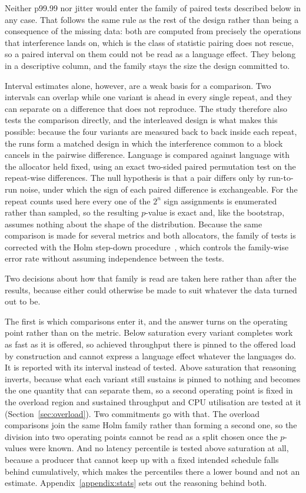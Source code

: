 \documentclass[english,oneside,a4paper,censored,csm,software-track-2020]{HYthesisML}
\begin{document}
Neither p99.99 nor jitter would enter the family of paired tests described below in any case.
That follows the same rule as the rest of the design rather than being a consequence of the
missing data: both are computed from precisely the operations that interference lands on, which
is the class of statistic pairing does not rescue, so a paired interval on them could not be
read as a language effect. They belong in a descriptive column, and the family stays the size
the design committed to.

Interval estimates alone, however, are a weak basis for a comparison. Two intervals can overlap
while one variant is ahead in every single repeat, and they can separate on a difference that
does not reproduce. The study therefore also tests the comparison directly, and the interleaved
design is what makes this possible: because the four variants are measured back to back inside
each repeat, the runs form a matched design in which the interference common to a block cancels
in the pairwise difference. Language is compared against language with the allocator held
fixed, using an exact two-sided paired permutation test on the repeat-wise differences. The
null hypothesis is that a pair differs only by run-to-run noise, under which the sign of each
paired difference is exchangeable. For the repeat counts used here every one of the $2^{n}$
sign assignments is enumerated rather than sampled, so the resulting $p$-value is exact and,
like the bootstrap, assumes nothing about the shape of the distribution. Because the same
comparison is made for several metrics and both allocators, the family of tests is corrected
with the Holm step-down procedure~\cite{holm1979simple}, which controls the family-wise error
rate without assuming independence between the tests.

Two decisions about how that family is read are taken here rather than after the results,
because either could otherwise be made to suit whatever the data turned out to be.

The first is which comparisons enter it, and the answer turns on the operating point rather than
on the metric. Below saturation every variant completes work as fast as it is offered, so achieved
throughput there is pinned to the offered load by construction and cannot express a language
effect whatever the languages do. It is reported with its interval instead of tested. Above
saturation that reasoning inverts, because what each variant still sustains is pinned to nothing
and becomes the one quantity that can separate them, so a second operating point is fixed in the
overload region and sustained throughput and CPU utilisation are tested at it
(Section~\ref{sec:overload}). Two commitments go with that. The overload comparisons join the same
Holm family rather than forming a second one, so the division into two operating points cannot be
read as a split chosen once the $p$-values were known. And no latency percentile is tested above
saturation at all, because a producer that cannot keep up with a fixed intended schedule falls
behind cumulatively, which makes the percentiles there a lower bound and not an estimate.
Appendix~\ref{appendix:stats} sets out the reasoning behind both.
\end{document}
